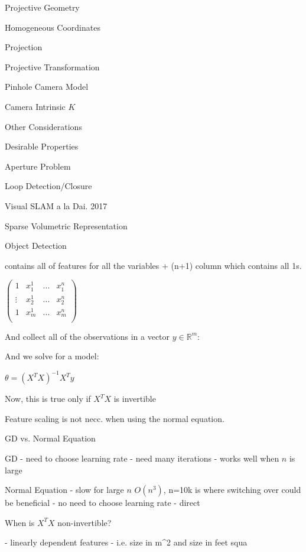 \begin{section}
\begin{subsubsection}
\begin{subsubsection}
\begin{subsubsection}
\begin{section}{Projective Geometry}
\begin{subsection}{Homogeneous Coordinates}
\begin{subsubsection}
{\begin{subsubsection}{Projection}
\begin{subsubsection}{Projective Transformation}
\begin{subsection}
\begin{subsubsection}
\begin{subsubsection}
\begin{subsubsection}
{\begin{subsubsection}
\begin{subsection}
\begin{subsection} {Pinhole Camera Model}
\begin{subsection} {Camera Intrinsic $K$}
\begin{subsection}
\begin{subsection}
\begin{subsubsection}{Other Considerations}
{\begin{subsection}
\begin{subsubsection}{Desirable Properties}
\begin{section}
\begin{subsection}
\begin{subsection}
\begin{subsection}
\begin{section}
\begin{subsection}
\begin{subsubsection}
\begin{subsubsection}
\begin{subsection}
\begin{section}
\begin{subsection}
\begin{subsubsection}{Aperture Problem}
\begin{subsubsection}
{\begin{section}
\begin{subsubsection}
\begin{subsubsection}
\begin{subsubsection}
\begin{subsection}
\begin{subsection}
\begin{subsection}
\begin{subsection}
\begin{subsection}
\begin{subsection}
\begin{subsection}
\begin{subsubsection}
{\begin{subsubsection}
{\begin{subsubsection}
\begin{section}
\begin{section}
\begin{section}
\begin{subsubsection}
\begin{subsubsection}{Loop Detection/Closure}
\begin{subsubsection}{Visual SLAM a la Dai. 2017}
\begin{subsubsection}{Sparse Volumetric Representation}
\begin{subsection}
\begin{section}{Object Detection}
\begin{subsubsection}
{\begin{subsection}
\begin{subsection}
\begin{section}
\begin{section}
\begin{subsection}
\begin{subsubsection}
\begin{subsubsection}
\begin{subsection}
\begin{subsection}
\begin{subsubsection}
\begin{subsubsection}
\begin{subsubsection}
{\begin{subsection}
\begin{subsection}
contains all of features for all the variables + (n+1) column which contains all 1s.

$\left( \begin{matrix} 1 & x_1^1 & ... & x_1^n \\ \vdots & x_2^1 & ... & x_2^n \\   1 & x_m^1 & ... & x_m^n \\ \end{matrix} \right)$

And collect all of the observations in a vector $y \in \mathbb{R}^m $:

And we solve for a model:

$\theta = (X^T X)^{-1} X^T y$



Now, this is true only if $X^T X$ is invertible

Feature scaling is not necc. when using the normal equation.

\begin{subsection} GD vs. Normal Equation

GD
- need to choose learning rate
- need many iterations
- works well when $n$ is large

Normal Equation 
- slow for large $n$  $O(n^3)$, n=10k is where switching over could be beneficial
- no need to choose learning rate
- direct

\begin{subsection} When is $X^TX$ non-invertible? 

- linearly dependent features - i.e. size in m^2 and size in feet squa
\end{subsection}
\end{subsection}
\end{subsection}
\end{subsection}}
\end{subsubsection}
\end{subsubsection}
\end{subsubsection}
\end{subsection}
\end{subsection}
\end{subsubsection}
\end{subsubsection}
\end{subsection}
\end{section}
\end{section}
\end{subsection}
\end{subsection}}
\end{subsubsection}
\end{section}
\end{subsection}
\end{subsubsection}
\end{subsubsection}
\end{subsubsection}
\end{subsubsection}
\end{section}
\end{section}
\end{section}
\end{subsubsection}}
\end{subsubsection}}
\end{subsubsection}
\end{subsection}
\end{subsection}
\end{subsection}
\end{subsection}
\end{subsection}
\end{subsection}
\end{subsection}
\end{subsubsection}
\end{subsubsection}
\end{subsubsection}
\end{section}}
\end{subsubsection}
\end{subsubsection}
\end{subsection}
\end{section}
\end{subsection}
\end{subsubsection}
\end{subsubsection}
\end{subsection}
\end{section}
\end{subsection}
\end{subsection}
\end{subsection}
\end{section}
\end{subsubsection}
\end{subsection}}
\end{subsubsection}
\end{subsection}
\end{subsection}
\end{subsection}
\end{subsection}
\end{subsection}
\end{subsubsection}}
\end{subsubsection}
\end{subsubsection}
\end{subsubsection}
\end{subsection}
\end{subsubsection}
\end{subsubsection}}
\end{subsubsection}
\end{subsection}
\end{section}
\end{subsubsection}
\end{subsubsection}
\end{subsubsection}
\end{section}
